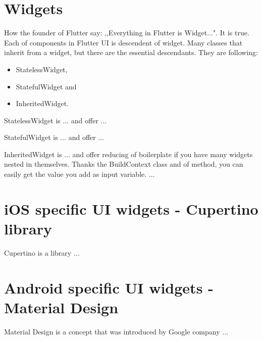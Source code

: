 \section{Widgets}\label{sec:widgets}
How the founder of Flutter say: ,,Everything in Flutter is Widget...".
It is true.
Each of components in Flutter UI is descendent of widget.
Many classes that inherit from a widget, but there are the essential descendants.
They are following:
\begin{itemize}
    \item StatelessWidget,
    \item StatefulWidget and
    \item InheritedWidget.
\end{itemize}{}
StatelessWidget is ... and offer ... \cite{statelessWidget}

StatefulWidget is ... and offer ... \cite{statefulWidget}

InheritedWidget is ... and offer reducing of boilerplate if you have many widgets nested in themselves.
Thanks the BuildContext class and of method, you can easily get the value you add as input variable.
... \cite{inheritedWidget}


\section{iOS specific UI widgets - Cupertino library}\label{sec:ios-specific-ui-widgets}
Cupertino is a library ...


\section{Android specific UI widgets - Material Design}\label{sec:android-specific-ui-widgets}
Material Design is a concept that was introduced by Google company ...

